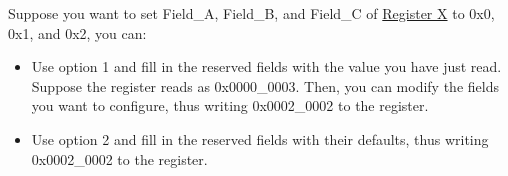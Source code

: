 Suppose you want to set Field\_A, Field\_B, and Field\_C of \hyperref[fig:registerX]{Register X} to 0x0, 0x1, and 0x2, you can:

\begin{itemize}
    \item Use option 1 and fill in the reserved fields with the value you have just read. Suppose the register reads as 0x0000\_0003. Then, you can modify the fields you want to configure, thus writing 0x0002\_0002 to the register.
    \item Use option 2 and fill in the reserved fields with their defaults, thus writing 0x0002\_0002 to the register.
\end{itemize}
